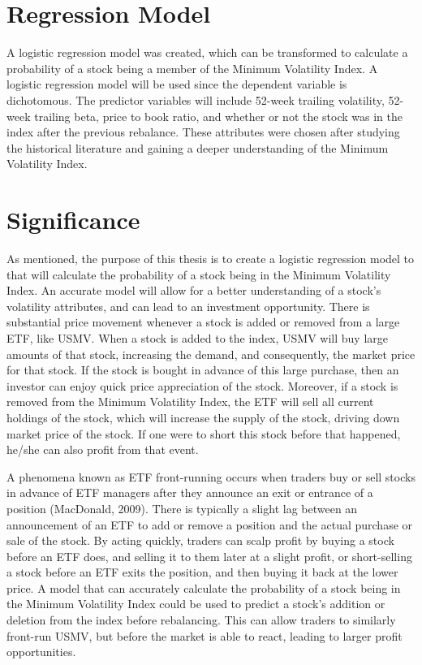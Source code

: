 \documentclass[12pt,twoside]{reedthesis}
\theoremstyle{definition}
\theoremstyle{definition}
\theoremstyle{definition}
\theoremstyle{remark}
\begin{document}
\section{Regression Model}\label{regression-model}

A logistic regression model was created, which can be transformed to
calculate a probability of a stock being a member of the Minimum
Volatility Index. A logistic regression model will be used since the
dependent variable is dichotomous. The predictor variables will include
52-week trailing volatility, 52-week trailing beta, price to book ratio,
and whether or not the stock was in the index after the previous
rebalance. These attributes were chosen after studying the historical
literature and gaining a deeper understanding of the Minimum Volatility
Index.

\section{Significance}\label{significance}

As mentioned, the purpose of this thesis is to create a logistic
regression model to that will calculate the probability of a stock being
in the Minimum Volatility Index. An accurate model will allow for a
better understanding of a stock's volatility attributes, and can lead to
an investment opportunity. There is substantial price movement whenever
a stock is added or removed from a large ETF, like USMV. When a stock is
added to the index, USMV will buy large amounts of that stock,
increasing the demand, and consequently, the market price for that
stock. If the stock is bought in advance of this large purchase, then an
investor can enjoy quick price appreciation of the stock. Moreover, if a
stock is removed from the Minimum Volatility Index, the ETF will sell
all current holdings of the stock, which will increase the supply of the
stock, driving down market price of the stock. If one were to short this
stock before that happened, he/she can also profit from that event.

A phenomena known as ETF front-running occurs when traders buy or sell
stocks in advance of ETF managers after they announce an exit or
entrance of a position (MacDonald, 2009). There is typically a slight
lag between an announcement of an ETF to add or remove a position and
the actual purchase or sale of the stock. By acting quickly, traders can
scalp profit by buying a stock before an ETF does, and selling it to
them later at a slight profit, or short-selling a stock before an ETF
exits the position, and then buying it back at the lower price. A model
that can accurately calculate the probability of a stock being in the
Minimum Volatility Index could be used to predict a stock's addition or
deletion from the index before rebalancing. This can allow traders to
similarly front-run USMV, but before the market is able to react,
leading to larger profit opportunities.
\end{document}

